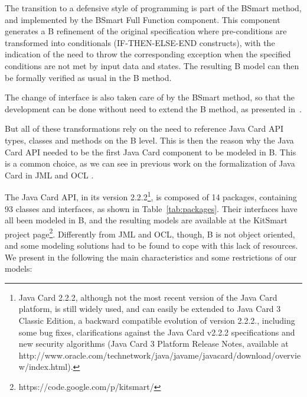 \documentclass{entcs}
\begin{document}
The transition to a defensive style of programming is part of the
BSmart method, and implemented by the BSmart Full Function
component. This component generates a B refinement of the original
specification where pre-conditions are transformed into conditionals
(IF-THEN-ELSE-END constructs), with the indication of the need to
throw the corresponding exception when the specified conditions are
not met by input data and states.  The resulting B model can then be
formally verified as usual in the B method.

The change of interface is also taken care of by the BSmart method, so
that the development can be done without need to extend the B
method, as presented in~\cite{Gomes10}.

But all of these transformations rely on the need to reference Java
Card API types, classes and methods on the B level.  This is then the
reason why the Java Card API needed to be the first Java Card
component to be modeled in B. This is a common choice, as we can see in previous work on the formalization of 
Java Card in JML \cite{pollBerg01} and OCL \cite{Larsson:2004}. 

The Java Card API, in its version 2.2.2\footnote{Java Card 2.2.2,
  although not the most recent version of the Java Card platform, is
  still widely used, and can easily be extended to Java Card 3 Classic
  Edition, a backward compatible evolution of version 2.2.2.,
  including some bug fixes, clarifications against the Java Card
  v2.2.2 specifications and new security algorithms (Java Card 3
  Platform Release Notes, available at
  http://www.oracle.com/technetwork/java/javame/javacard/download/overview/index.html).}, is composed of 14
packages, containing 93 classes and interfaces, as shown in
Table~\ref{tab:packages}. Their interfaces have all been modeled in B,
and the resulting models are available at the KitSmart project
page\footnote{https://code.google.com/p/kitsmart/}.  Differently from
JML and OCL, though, B is not object oriented, and some modeling
solutions had to be found to cope with this lack of resources.  We
present in the following the main characteristics and some
restrictions of our models:
\end{document}
